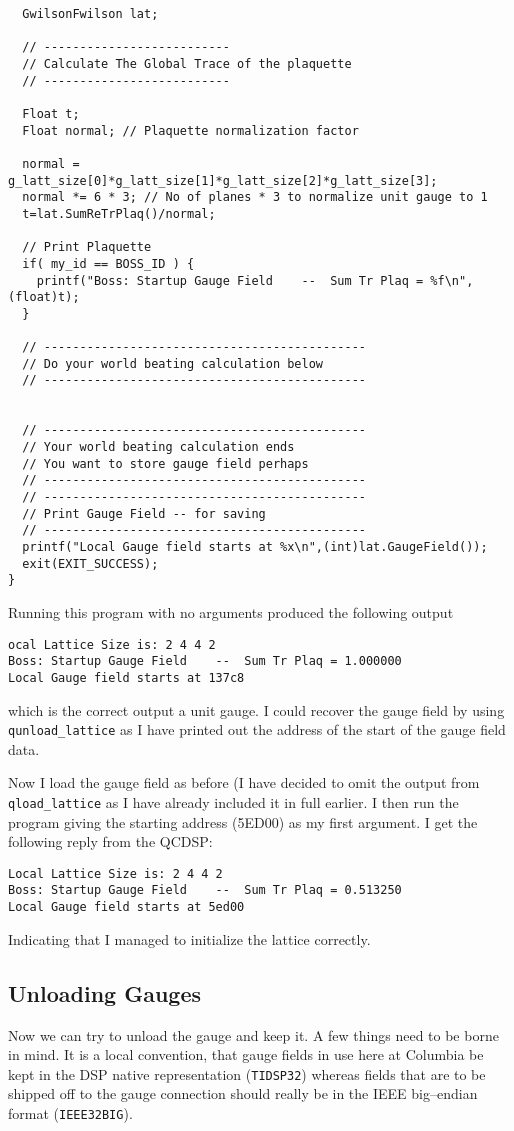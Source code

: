 {\begin{verbatim}
  GwilsonFwilson lat;

  // --------------------------
  // Calculate The Global Trace of the plaquette
  // --------------------------

  Float t;
  Float normal; // Plaquette normalization factor

  normal = g_latt_size[0]*g_latt_size[1]*g_latt_size[2]*g_latt_size[3];
  normal *= 6 * 3; // No of planes * 3 to normalize unit gauge to 1
  t=lat.SumReTrPlaq()/normal;

  // Print Plaquette
  if( my_id == BOSS_ID ) {
    printf("Boss: Startup Gauge Field    --  Sum Tr Plaq = %f\n",(float)t);
  }

  // ---------------------------------------------
  // Do your world beating calculation below
  // ---------------------------------------------


  // ---------------------------------------------
  // Your world beating calculation ends
  // You want to store gauge field perhaps
  // --------------------------------------------- 
  // --------------------------------------------- 
  // Print Gauge Field -- for saving
  // ---------------------------------------------
  printf("Local Gauge field starts at %x\n",(int)lat.GaugeField());
  exit(EXIT_SUCCESS);
}
\end{verbatim}
}

Running this program with no arguments produced the following output
\begin{verbatim}
ocal Lattice Size is: 2 4 4 2
Boss: Startup Gauge Field    --  Sum Tr Plaq = 1.000000
Local Gauge field starts at 137c8
\end{verbatim}
which is the correct output a unit gauge.
I could recover the gauge field by using {\tt qunload\_lattice}
as I have printed out the address of the start of the gauge field data.

Now I load the gauge field as before (I have decided to omit the output
from {\tt qload\_lattice} as I have already included it in full earlier.
I then run the program giving the starting address (5ED00) as my 
first argument. I get the following reply from the QCDSP:
\begin{verbatim}
Local Lattice Size is: 2 4 4 2
Boss: Startup Gauge Field    --  Sum Tr Plaq = 0.513250
Local Gauge field starts at 5ed00
\end{verbatim}
Indicating that I managed to initialize the lattice correctly.

\subsection{Unloading Gauges}\label{s:GaugeUnload}
Now we can try to unload the gauge and keep it. A few things need to be 
borne in mind. It is a local convention, that gauge fields in use here
at Columbia be kept in the DSP native representation ({\tt TIDSP32}) whereas
fields that are to be shipped off to the gauge connection should really be
in the IEEE big--endian format ({\tt IEEE32BIG}).

